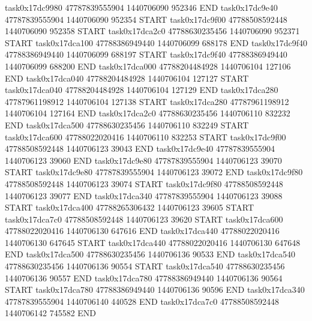 task0x17dc9980 47787839555904          1440706090               952346  END
task0x17dc9e40 47787839555904          1440706090               952354  START
task0x17dc9f00 47788508592448          1440706090               952358  START
task0x17dca2c0 47788630235456          1440706090               952371  START
task0x17dca100 47788386949440          1440706099               688178  END
task0x17dc9f40 47788386949440          1440706099               688197  START
task0x17dc9f40 47788386949440          1440706099               688200  END
task0x17dca000 47788204484928          1440706104               127106  END
task0x17dca040 47788204484928          1440706104               127127  START
task0x17dca040 47788204484928          1440706104               127129  END
task0x17dca280 47787961198912          1440706104               127138  START
task0x17dca280 47787961198912          1440706104               127164  END
task0x17dca2c0 47788630235456          1440706110               832232  END
task0x17dca500 47788630235456          1440706110               832249  START
task0x17dca600 47788022020416          1440706110               832253  START
task0x17dc9f00 47788508592448          1440706123                39043  END
task0x17dc9e40 47787839555904          1440706123                39060  END
task0x17dc9e80 47787839555904          1440706123                39070  START
task0x17dc9e80 47787839555904          1440706123                39072  END
task0x17dc9f80 47788508592448          1440706123                39074  START
task0x17dc9f80 47788508592448          1440706123                39077  END
task0x17dca340 47787839555904          1440706123                39088  START
task0x17dca400 47788265306432          1440706123                39605  START
task0x17dca7c0 47788508592448          1440706123                39620  START
task0x17dca600 47788022020416          1440706130               647616  END
task0x17dca440 47788022020416          1440706130               647645  START
task0x17dca440 47788022020416          1440706130               647648  END
task0x17dca500 47788630235456          1440706136                90533  END
task0x17dca540 47788630235456          1440706136                90554  START
task0x17dca540 47788630235456          1440706136                90557  END
task0x17dca780 47788386949440          1440706136                90564  START
task0x17dca780 47788386949440          1440706136                90596  END
task0x17dca340 47787839555904          1440706140               440528  END
task0x17dca7c0 47788508592448          1440706142               745582  END
